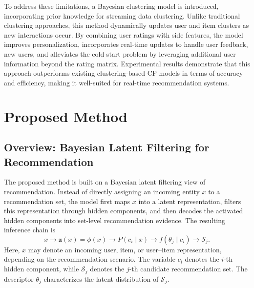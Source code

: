 \documentclass{article}
\theoremstyle{plain}
\theoremstyle{definition}
\theoremstyle{remark}
\begin{document}
To address these limitations, a Bayesian clustering model is introduced, incorporating prior knowledge for streaming data clustering. Unlike traditional clustering approaches, this method dynamically updates user and item clusters as new interactions occur. By combining user ratings with side features, the model improves personalization, incorporates real-time updates to handle user feedback, new users, and alleviates the cold start problem by leveraging additional user information beyond the rating matrix. Experimental results demonstrate that this approach outperforms existing clustering-based CF models in terms of accuracy and efficiency, making it well-suited for real-time recommendation systems. 























\section{Proposed Method}
\label{sec:proposed_method}

\subsection{Overview: Bayesian Latent Filtering for Recommendation}
\label{subsec:overview}

The proposed method is built on a Bayesian latent filtering view of recommendation. Instead of directly assigning an incoming entity \(x\) to a recommendation set, the model first maps \(x\) into a latent representation, filters this representation through hidden components, and then decodes the activated hidden components into set-level recommendation evidence. The resulting inference chain is
\[
x
\longrightarrow
\mathbf z(x)=\phi(x)
\longrightarrow
P(c_i\mid x)
\longrightarrow
f(\theta_j\mid c_i)
\longrightarrow
\mathcal S_j .
\]
Here, \(x\) may denote an incoming user, item, or user--item representation, depending on the recommendation scenario. The variable \(c_i\) denotes the \(i\)-th hidden component, while \(\mathcal S_j\) denotes the \(j\)-th candidate recommendation set. The descriptor \(\theta_j\) characterizes the latent distribution of \(\mathcal S_j\).
\end{document}

